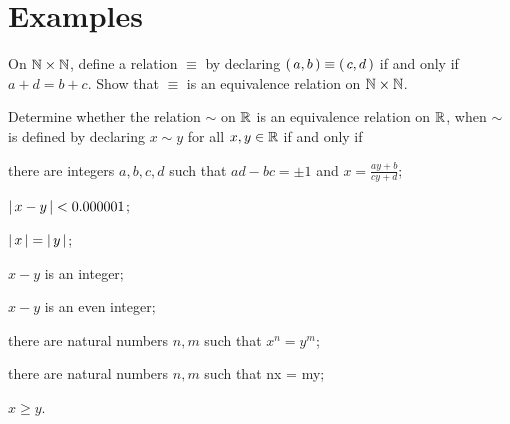 \documentclass[11pt]{amsbook}
\begin{document}
    \section*{Examples}
    \begin{hEnumerateArabic}
        \item On $\mathbb{N} \times \mathbb{N}$, define a relation $\equiv$ by declaring $ \left( \, a,b \, \right) \equiv  \left( \, c,d \, \right) $ if and only if $a+d=b+c$. Show that $\equiv$ is an equivalence relation on $\mathbb{N} \times \mathbb{N}$.
        \item Determine whether the relation $\sim$ on $\mathbb{R}$ is an equivalence relation on $\mathbb{R}$, when $\sim$ is defined by declaring $x\sim y$ for all $x,y\in \mathbb{R} $ if and only if 
        \begin{hEnumerateAlpha}
            \item there are integers $a,b,c,d$ such that $ad-bc=\pm 1$ and $x=\frac{ay+b}{cy+d}$;
            \item $\left \lvert \, x-y \, \right \rvert < 0.000001$;
            \item $\left \lvert \, x \, \right \rvert=\left \lvert \, y \, \right \rvert$;
            \item $x-y$ is an integer;
            \item $x-y$ is an even integer; 
            \item there are natural numbers $n,m$ such that $x^{n} = y^{m}$; 
            \item there are natural numbers $n,m$ such that nx = my;
            \item $x\geq y$.
        \end{hEnumerateAlpha}
\end{hEnumerateArabic}
\end{document}
